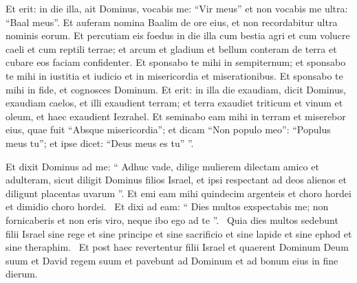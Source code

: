 \begin{biblechapter}
\begin{biblechapter}
 \verse Et erit: in die illa,
 ait Dominus,
 vocabis me: “Vir meus”
 et non vocabis me ultra: “Baal meus”.
 \verse Et auferam nomina Baalim de ore eius,
 et non recordabitur ultra nominis eorum.
 \verse Et percutiam eis foedus in die illa
 cum bestia agri et cum volucre caeli et cum reptili terrae;
 et arcum et gladium et bellum
 conteram de terra
 et cubare eos faciam confidenter.
 \verse Et sponsabo te mihi in sempiternum;
 et sponsabo te mihi in iustitia et iudicio
 et in misericordia et miserationibus.
 \verse Et sponsabo te mihi in fide,
 et cognosces Dominum.
 \verse Et erit: in illa die exaudiam,
 dicit Dominus,
 exaudiam caelos,
 et illi exaudient terram;
 \verse et terra exaudiet
 triticum et vinum et oleum,
 et haec exaudient Iezrahel.
 \verse Et seminabo eam mihi in terram
 et miserebor eius, quae fuit “Absque misericordia”;
 \verse et dicam “Non populo meo”: “Populus meus tu”;
 et ipse dicet: “Deus meus es tu” ”.
 
\begin{biblechapter}
 \verse Et dixit Dominus ad me: “ Adhuc vade, dilige mulierem dilectam amico et adulteram, sicut diligit Dominus filios Israel, et ipsi respectant ad deos alienos et diligunt placentas uvarum ”.
 \verse Et emi eam mihi quindecim argenteis et choro hordei et dimidio choro hordei. 
 \verse Et dixi ad eam: “ Dies multos exspectabis me; non fornicaberis et non eris viro, neque ibo ego ad te ”. 
 \verse Quia dies multos sedebunt filii Israel sine rege et sine principe et sine sacrificio et sine lapide et sine ephod et sine theraphim. 
 \verse Et post haec revertentur filii Israel et quaerent Dominum Deum suum et David regem suum et pavebunt ad Dominum et ad bonum eius in fine dierum.
 

\end{biblechapter}
\end{biblechapter}
\end{biblechapter}
